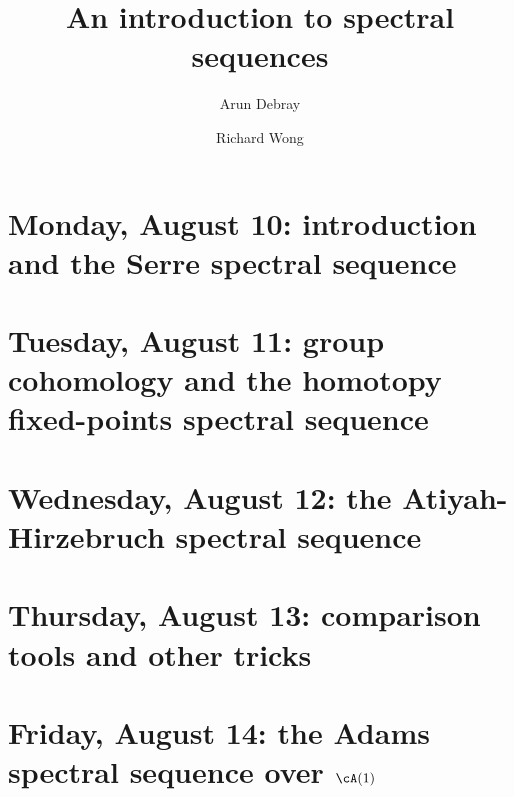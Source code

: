 \documentclass{amsart}
\begin{document}
\title{An introduction to spectral sequences}
\author{Arun Debray}
\author{Richard Wong}


	\maketitle


	\tableofcontents

	\section{Monday, August 10: introduction and the Serre spectral sequence}
		

	\section{Tuesday, August 11: group cohomology and the homotopy fixed-points spectral sequence}
		

	\section{Wednesday, August 12: the Atiyah-Hirzebruch spectral sequence}
		

	\section{Thursday, August 13: comparison tools and other tricks}
		

	\section{Friday, August 14: the Adams spectral sequence over $\cA(1)$}
		
\end{document}
